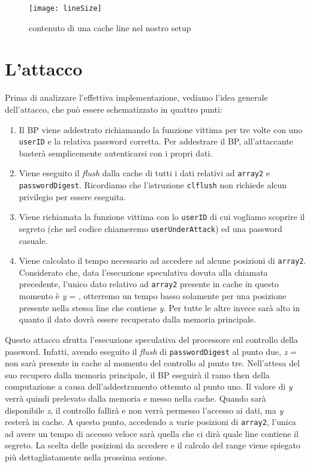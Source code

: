 		\begin{figure}
			\begin{center}
				\texttt{[image: lineSize]}
				\caption{contenuto di una cache line nel nostro setup}
				\label{fig:lineSize}
			\end{center}
		\end{figure}
		
		\section{L'attacco}
			Prima di analizzare l'effettiva implementazione, vediamo l'idea generale dell'attacco, che può essere schematizzato in quattro punti:
			
			\begin{enumerate}
				\item Il \ac{BP} viene addestrato richiamando la funzione vittima per tre volte con uno \texttt{userID} e la relativa password corretta. Per addestrare il BP, all'attaccante basterà semplicemente autenticarsi con i propri dati.
				\item Viene eseguito il \emph{flush} dalla cache di tutti i dati relativi ad \texttt{array2} e \texttt{passwordDigest}. Ricordiamo che l'istruzione \texttt{clflush} non richiede alcun privilegio per essere eseguita.
				\item Viene richiamata la funzione vittima con lo \texttt{userID} di cui vogliamo scoprire il segreto (che nel codice chiameremo \texttt{userUnderAttack}) ed una password casuale.
				\item Viene calcolato il tempo necessario ad accedere ad alcune posizioni di \texttt{array2}. Considerato che, data l'esecuzione speculativa dovuta alla chiamata precedente, l'unico dato relativo ad \texttt{array2} presente in cache in questo momento è \emph{y} = , otterremo un tempo basso solamente per una posizione presente nella stessa line che contiene \emph{y}. Per tutte le altre invece sarà alto in quanto il dato dovrà essere recuperato dalla memoria principale.
			\end{enumerate}
		
			Questo attacco sfrutta l'esecuzione speculativa del processore sul controllo della password. Infatti, avendo eseguito il \emph{flush} di \texttt{passwordDigest} al punto due, \emph{z} =  non sarà presente in cache al momento del controllo al punto tre. Nell'attesa del suo recupero dalla memoria principale, il \ac{BP} eseguirà il ramo then della computazione a causa dell'addestramento ottenuto al punto uno. Il valore di \emph{y} verrà quindi prelevato dalla memoria e messo nella cache. Quando sarà disponibile \emph{z}, il controllo fallirà e non verrà permesso l'accesso ai dati, ma \emph{y} resterà in cache. A questo punto, accedendo a varie posizioni di \texttt{array2}, l'unica ad avere un tempo di accesso veloce sarà quella che ci dirà quale line contiene il segreto. La scelta delle posizioni da accedere e il calcolo del range viene spiegato più dettagliatamente nella prossima sezione.
			
